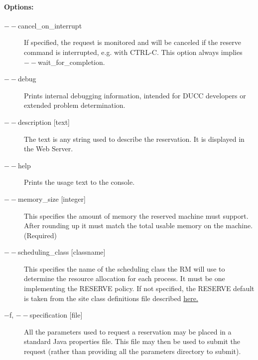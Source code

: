     \paragraph{Options:}
    
        \begin{description}

            \item[$--$cancel\_on\_interrupt] If specified, the request is monitored 
              and will be canceled if the reserve command is interrupted, e.g. with CTRL-C. 
              This option always implies $--$wait\_for\_completion.

            \item[$--$debug ]          
              Prints internal debugging information, intended for DUCC developers or extended problem determination.
              
            \item[$--$description {[text]}]               
              The text is any string used to describe the reservation. It is displayed in the Web Server. 
              
            \item[$--$help ]             
              Prints the usage text to the console. 
                            
            \item[$--$memory\_size {[integer]}]               
              This specifies the amount of memory the reserved machine must support. After rounding
              up it must match the total usable memory on the machine. (Required)

            \item[$--$scheduling\_class {[classname]}]               
              This specifies the name of the scheduling class the RM will use to determine the resource 
              allocation for each process. It must be one implementing the RESERVE policy.
              If not specified, the RESERVE default is taken from the site class definitions file
              described \hyperref[subsubsec:class.configuration]{here.} 
              
            \item[$-$f, $--$specification {[file]}]               
              All the parameters used to request a reservation may be placed in a standard Java 
              properties file. This file may then be used to submit the request (rather than providing all 
              the parameters directory to submit). 


\end{description}
